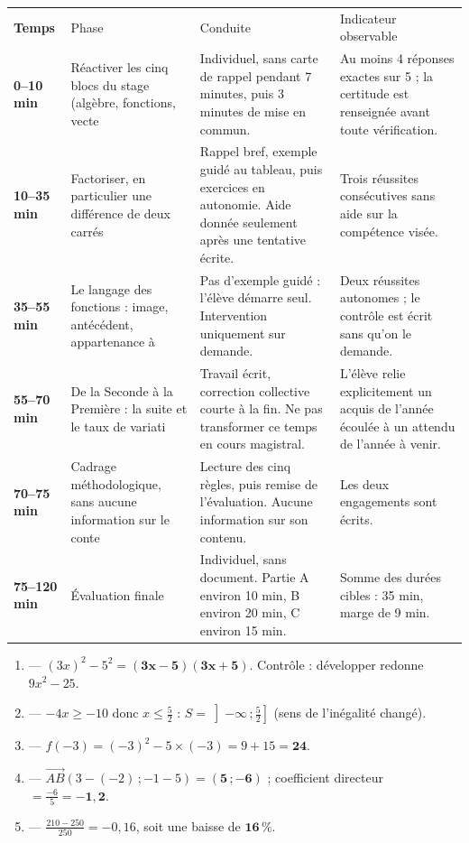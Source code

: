 \documentclass[10pt,a4paper]{article}
\begin{document}
\par\noindent\begin{tabularx}{\linewidth}{>{\bfseries}p{18mm} p{34mm} X X}
\rowcolor{Navy}\color{white}Temps & \color{white}Phase & \color{white}Conduite & \color{white}Indicateur observable \\
0--10 min & Réactiver les cinq blocs du stage (algèbre, fonctions, vecte & Individuel, sans carte de rappel pendant 7 minutes, puis 3 minutes de mise en commun. & Au moins 4 réponses exactes sur 5 ; la certitude est renseignée avant toute vérification. \\
10--35 min & Factoriser, en particulier une différence de deux carrés & Rappel bref, exemple guidé au tableau, puis exercices en autonomie. Aide donnée seulement après une tentative écrite. & Trois réussites consécutives sans aide sur la compétence visée. \\
35--55 min & Le langage des fonctions : image, antécédent, appartenance à & Pas d'exemple guidé : l'élève démarre seul. Intervention uniquement sur demande. & Deux réussites autonomes ; le contrôle est écrit sans qu'on le demande. \\
55--70 min & De la Seconde à la Première : la suite et le taux de variati & Travail écrit, correction collective courte à la fin. Ne pas transformer ce temps en cours magistral. & L'élève relie explicitement un acquis de l'année écoulée à un attendu de l'année à venir. \\
70--75 min & Cadrage méthodologique, sans aucune information sur le conte & Lecture des cinq règles, puis remise de l'évaluation. Aucune information sur son contenu. & Les deux engagements sont écrits. \\
75--120 min & Évaluation finale & Individuel, sans document. Partie A environ 10 min, B environ 20 min, C environ 15 min. & Somme des durées cibles : 35 min, marge de 9 min. \\
\end{tabularx}
\newpage{}
\begin{enumerate}
\item {} --- $(3x)^2-5^2=\mathbf{(3x-5)(3x+5)}$. Contrôle : développer redonne $9x^2-25$.
\item {} --- $-4x\ge -10$ donc $x\le \frac52$ : $S=\left]-\infty\,;\tfrac52\right]$ (sens de l'inégalité changé).
\item {} --- $f(-3)=(-3)^2-5\times(-3)=9+15=\mathbf{24}$.
\item {} --- $\vec{AB}(3-(-2)\,;-1-5)=\mathbf{(5\,;-6)}$ ; coefficient directeur $=\frac{-6}{5}=\mathbf{-1{,}2}$.
\item {} --- $\frac{210-250}{250}=-0{,}16$, soit une baisse de $\mathbf{16\,\%}$.
\end{enumerate}
\end{document}
